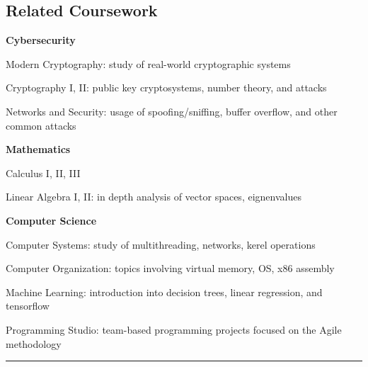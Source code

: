 \documentclass[10pt,letterpaper]{article}
\newenvironment{indentsection}[1]%
{\begin{list}{}%
	{\setlength{\leftmargin}{#1}}%
	\item[]%
}
{\end{list}}
\begin{document}
\subsection*{Related Coursework}
	\begin{indentsection}{\parindent}
		\begin{itemize*}
		\item \textbf{Cybersecurity} 
		\vspace{-0.2em}
			\begin{itemize*}
				\item Modern Cryptography: study of real-world cryptographic systems
				\item Cryptography I, II: public key cryptosystems, number theory, and attacks
				\item Networks and Security: usage of spoofing/sniffing, buffer overflow, and other common attacks
			\end{itemize*}
		\item \textbf{Mathematics} 
		\vspace{-0.2em}
			\begin{itemize*}
				\item Calculus I, II, III
				\item Linear Algebra I, II: in depth analysis of vector spaces, eignenvalues
			\end{itemize*}
		\item \textbf{Computer Science}
		\vspace{-0.2em}
			\begin{itemize*}
				\item Computer Systems: study of multithreading, networks, kerel operations
				\item Computer Organization: topics involving virtual memory, OS, x86 assembly
				\item Machine Learning: introduction into decision trees, linear regression, and tensorflow
				\item Programming Studio: team-based programming projects focused on the Agile methodology 
			\end{itemize*}
		\end{itemize*}
	\end{indentsection}
\else 
\hrule
\vspace{-0.8em}
\end{document}
